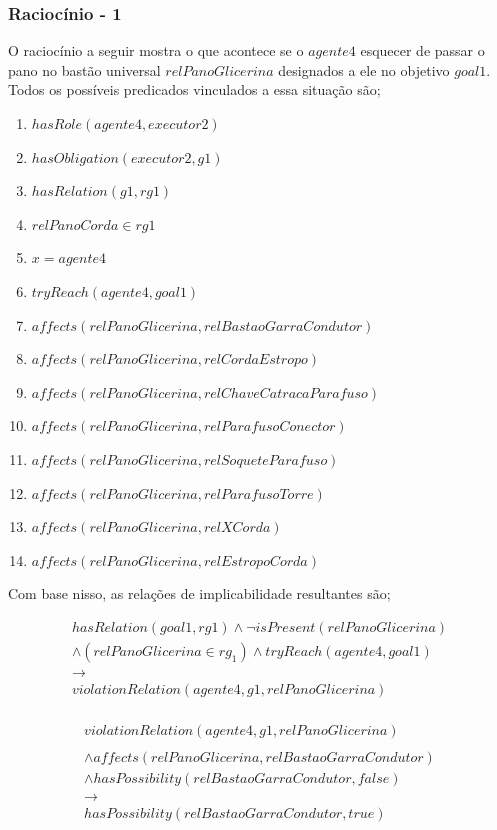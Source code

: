 \documentclass[12pt]{article}
\begin{document}
\subsubsection{Raciocínio - 1} 


O raciocínio a seguir mostra o que acontece se o $agente4$ esquecer de passar o pano no bastão universal $relPanoGlicerina$ designados a ele no objetivo $goal1$. Todos os possíveis predicados vinculados a essa situação são;

\begin{enumerate}
	\item $hasRole(agente4,executor2)$ 
	\item $hasObligation(executor2,g1)$
	\item $hasRelation(g1,rg1)$ 
	\item $relPanoCorda \in rg1$
	\item $ x = agente4 $
	\item $tryReach(agente4,goal1)$
	\item $affects(relPanoGlicerina,relBastaoGarraCondutor)$
	\item $affects(relPanoGlicerina,relCordaEstropo)$  
	\item $affects(relPanoGlicerina,relChaveCatracaParafuso)$
	\item $affects(relPanoGlicerina,relParafusoConector)$ 
	\item $affects(relPanoGlicerina,relSoqueteParafuso)$ 
	\item $affects(relPanoGlicerina,relParafusoTorre)$
	\item $affects(relPanoGlicerina,relXCorda)$ 
	\item $affects(relPanoGlicerina,relEstropoCorda)$	
\end{enumerate}

Com base nisso, as relações de implicabilidade resultantes são;

\begin{eqnarray}\nonumber
	hasRelation(goal1,rg1)\wedge \neg isPresent(relPanoGlicerina)  \nonumber \\ 
	\wedge (relPanoGlicerina\in rg_1) \wedge tryReach(agente4,goal1) \nonumber \\ 
	\to \nonumber \\ 
	violationRelation(agente4,g1,relPanoGlicerina) \nonumber \\	
\end{eqnarray}

\begin{eqnarray}\nonumber
	violationRelation(agente4,g1,relPanoGlicerina)  \nonumber \\ 
	\nonumber \\ 
	\wedge affects(relPanoGlicerina,relBastaoGarraCondutor)   \nonumber \\ 
	\wedge hasPossibility(relBastaoGarraCondutor,false) \nonumber \\  
	\to \nonumber \\  
	hasPossibility(relBastaoGarraCondutor,true) 
\end{eqnarray}
\end{document}
